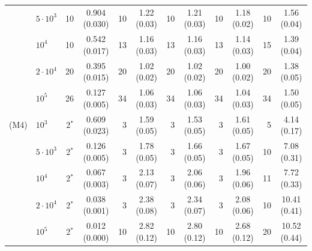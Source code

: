 \begin{tabular}{llrcrcrcrcrc}
 & $5\cdot10^3$ & 10 & 0.904 (0.030) & 10 & 1.22 (0.03) & 10 & 1.21 (0.03) & 10 & 1.18 (0.02) & 10 & 1.56 (0.04)\\
 & $10^4$ & 10 & 0.542 (0.017) & 13 & 1.16 (0.03) & 13 & 1.16 (0.03) & 13 & 1.14 (0.03) & 15 & 1.39 (0.04)\\
 & $2\cdot10^4$ & 20 & 0.395 (0.015) & 20 & 1.02 (0.02) & 20 & 1.02 (0.02) & 20 & 1.00 (0.02) & 20 & 1.38 (0.05)\\
 & $10^5$ & 26 & 0.127 (0.005) & 34 & 1.06 (0.03) & 34 & 1.06 (0.03) & 34 & 1.04 (0.03) & 34 & 1.50 (0.05)\\
\addlinespace[2pt]
(M4) & $10^3$ & 2$^{\ast}$ & 0.609 (0.023) & 3 & 1.59 (0.05) & 3 & 1.53 (0.05) & 3 & 1.61 (0.05) & 5 & 4.14 (0.17)\\
 & $5\cdot10^3$ & 2$^{\ast}$ & 0.126 (0.005) & 3 & 1.78 (0.05) & 3 & 1.66 (0.05) & 3 & 1.67 (0.05) & 10 & 7.08 (0.31)\\
 & $10^4$ & 2$^{\ast}$ & 0.067 (0.003) & 3 & 2.13 (0.07) & 3 & 2.06 (0.06) & 3 & 1.96 (0.06) & 11 & 7.72 (0.33)\\
 & $2\cdot10^4$ & 2$^{\ast}$ & 0.038 (0.001) & 3 & 2.38 (0.08) & 3 & 2.34 (0.07) & 3 & 2.08 (0.06) & 10 & 10.41 (0.41)\\
 & $10^5$ & 2$^{\ast}$ & 0.012 (0.000) & 10 & 2.82 (0.12) & 10 & 2.80 (0.12) & 10 & 2.68 (0.12) & 20 & 10.52 (0.44)\\
\bottomrule
\end{tabular}\endgroup

